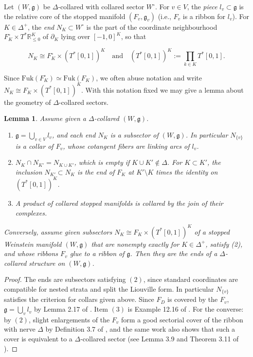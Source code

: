 \documentclass[11pt]{amsart}
\newtheorem{lem}[thm]{Lemma}
\theoremstyle{definition}
\theoremstyle{remark}
\newcommand{\Fuk}{\mathrm{Fuk}}
\numberwithin{equation}{section}
\begin{document}
Let $(W,\mathfrak g)$ be $\Delta$-collared with collared sector $W^\circ$. For $v\in V$, the \textit{piece} $l_v\subset\mathfrak g$ is the relative core of the stopped manifold $(F_v,\mathfrak g_v)$ (i.e., $F_v$ is a ribbon for $l_v$). For $K\in\Delta^+$, the \textit{end} $N_K \subset W^\circ$ is the part of the coordinate neighbourhood $F^\circ_K\times T^*\mathbb R^K_{\le0}$ of $\partial_K$ lying over $[-1,0]^K$, so that

$$N_K\cong F^\circ_K\times(T^*[0,1])^K \quad \text{and} \quad (T^*[0,1])^K:=\textstyle\prod_{k\in K}T^*[0,1].$$

Since $\Fuk(F^\circ_K)\simeq \Fuk(F_K)$, we often abuse notation and write $N_K\cong F_K\times(T^*[0,1])^K$. With this notation fixed we may give a lemma about the geometry of $\Delta$-collared sectors.

\begin{lem}\label{delta collard features}
    Assume given a $\Delta$-collared $(W,\mathfrak g)$.

    \begin{enumerate}
        \item $\mathfrak g=\bigcup_{v\in V}l_v$, and each end $N_K$ is a subsector of $(W,\mathfrak g)$. In particular $N_{\{v\}}$ is a collar of $F_v$, whose cotangent fibers are linking arcs of $l_v$.
        \item $N_K\cap N_{K'}=N_{K\cup K'}$, which is empty if $K\cup K'\notin\Delta$. For $K\subset K'$, the inclusion $N_{K'}\subset N_K$ is the end of $F_K$ at $K'\setminus K$ times the identity on $(T^*[0,1])^K$.
        \item A product of collared stopped manifolds is collared by the join of their complexes.
    \end{enumerate}

    Conversely, assume given subsectors $N_K\cong F_K\times(T^*[0,1])^K$ of a stopped Weinstein manifold $(W,\mathfrak g)$ that are nonempty exactly for $K\in\Delta^+$, satisfy (2), and whose ribbons $F_v$ glue to a ribbon of $\mathfrak g$. Then they are the ends of a $\Delta$-collared structure on $(W,\mathfrak g)$.
\end{lem}

\begin{proof}
    The ends are subsectors satisfying $(2)$, since standard coordinates are compatible for nested strata and split the Liouville form. In particular $N_{\{v\}}$ satisfies the criterion for collars given above. Since $F_D$ is covered by the $F_v$, $\mathfrak g=\bigcup_vl_v$ by Lemma 2.17 of \cite{Asplund}. Item $(3)$ is Example 12.16 of \cite{GPSI}. For the converse: by $(2)$, slight enlargements of the $F_v$ form a good sectorial cover of the ribbon with nerve $\Delta$ by Definition 3.7 of \cite{Asplund}, and the same work also shows that such a cover is equivalent to a $\Delta$-collared sector (see Lemma 3.9 and Theorem 3.11 of \cite{Asplund}).
\end{proof}
\end{document}

